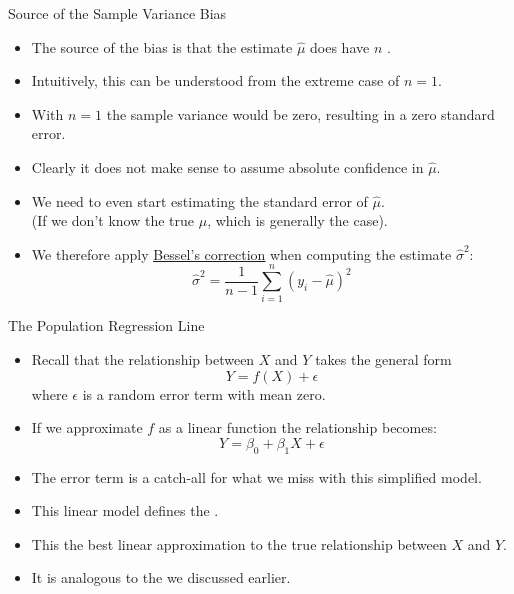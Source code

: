 \documentclass[mathserif, aspectratio=169]{beamer}
\begin{document}
\begin{frame}{Source of the Sample Variance Bias}
	\begin{itemize}
		\item The source of the bias is that the estimate $\hat{\mu}$ does  have $n$
			.
		\item Intuitively, this can be understood from the extreme case of $n=1$.
		\item With $n=1$ the sample variance would be zero, resulting in a zero standard error.
		\item Clearly it does not make sense to assume absolute confidence in $\hat{\mu}$.
		\item We need  to even start estimating the standard error
			of $\hat{\mu}$.\\
			(If we don't know the true $\mu$, which is generally the case).
		\item We therefore apply
			\href{https://en.wikipedia.org/wiki/Bessel\%27s_correction}{\blue\underline{Bessel's correction}} 
			when computing the estimate $\hat{\sigma}^2$:
			\[ \hat{\sigma}^2 = \frac{1}{n-1}\sum_{i=1}^n (y_i - \hat{\mu})^2 \]
	\end{itemize}
\end{frame}

\begin{frame}{The Population Regression Line}
	\begin{itemize}
		\item Recall that the  relationship between $X$ and $Y$ takes the general form
			\[ Y = f(X) + \epsilon \]
			where $\epsilon$ is a random error term with mean zero.
		\item If we approximate $f$ as a linear function the relationship becomes:
			\[ Y = \beta_0 + \beta_1 X + \epsilon \]
		\item The error term is a catch-all for what we miss with this simplified model.
		\item This linear model defines the .
		\item This the best linear approximation to the true relationship between $X$ and $Y$.
		\item It is analogous to the  we discussed earlier.
	\end{itemize}
\end{frame}
\end{document}
